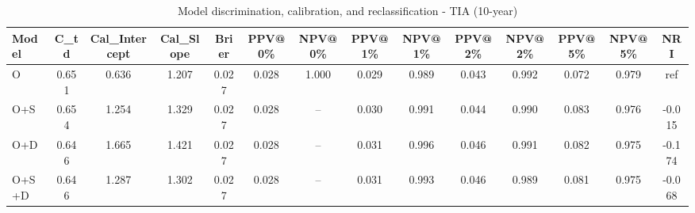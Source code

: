 \begin{table}[htbp]
\centering
\small
\caption{Model discrimination, calibration, and reclassification - TIA (10-year)}
\label{tab:perf_tia_10y}
\begin{tabular}{lccccccccccccc}
\toprule
Model & C\_td & Cal\_Intercept & Cal\_Slope & Brier & PPV@0\% & NPV@0\% & PPV@1\% & NPV@1\% & PPV@2\% & NPV@2\% & PPV@5\% & NPV@5\% & NRI \\
\midrule
O & 0.651 & 0.636 & 1.207 & 0.027 & 0.028 & 1.000 & 0.029 & 0.989 & 0.043 & 0.992 & 0.072 & 0.979 & ref \\
O+S & 0.654 & 1.254 & 1.329 & 0.027 & 0.028 & -- & 0.030 & 0.991 & 0.044 & 0.990 & 0.083 & 0.976 & -0.015 \\
O+D & 0.646 & 1.665 & 1.421 & 0.027 & 0.028 & -- & 0.031 & 0.996 & 0.046 & 0.991 & 0.082 & 0.975 & -0.174 \\
O+S+D & 0.646 & 1.287 & 1.302 & 0.027 & 0.028 & -- & 0.031 & 0.993 & 0.046 & 0.989 & 0.081 & 0.975 & -0.068 \\
\bottomrule
\end{tabular}
\end{table}
